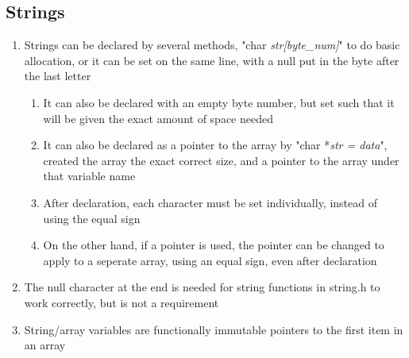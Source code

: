 \documentclass[11 pt, twoside]{article}
\begin{document}
\subsection{Strings}
\begin{enumerate}
\item Strings can be declared by several methods, "char \textit{str[byte\_num]}" to do basic allocation, or it can be set on the same line, with a null put in the byte after the last letter
\begin{enumerate}
\item It can also be declared with an empty byte number, but set such that it will be given the exact amount of space needed
\item It can also be declared as a pointer to the array by "char *\textit{str = data}", created the array the exact correct size, and a pointer to the array under that variable name
\item After declaration, each character must be set individually, instead of using the equal sign
\item On the other hand, if a pointer is used, the pointer can be changed to apply to a seperate array, using an equal sign, even after declaration
\end{enumerate}
\item The null character at the end is needed for string functions in string.h to work correctly, but is not a requirement
\item String/array variables are functionally immutable pointers to the first item in an array
\end{enumerate}
\end{document}
